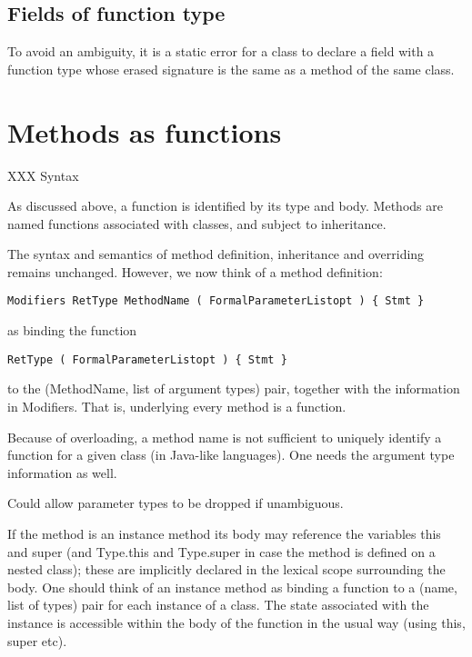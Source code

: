 \subsection{ Fields of function type}

To avoid an ambiguity, it is a static error for a class to declare a
field with a function type whose erased signature is the same as a
method of the same class.


\section{ Methods as functions}


      XXX Syntax


As discussed above, a function is identified by its type and body.
Methods are named functions associated with classes, and subject to
inheritance.

The syntax and semantics of method definition, inheritance and
overriding remains unchanged. However, we now think of a method definition:

\begin{verbatim}
Modifiers RetType MethodName ( FormalParameterListopt ) { Stmt }
\end{verbatim}

as binding the function

\begin{verbatim}
RetType ( FormalParameterListopt ) { Stmt }
\end{verbatim}

to the (MethodName, list of argument types) pair, together with the
information in Modifiers. That is, underlying every method is a function.

\begin{note}
Because of overloading, a method name is not sufficient to
uniquely identify a function for a given class (in Java-like languages).
One needs the argument type information as well.
\end{note}

\begin{note}
Could allow parameter types to be dropped if unambiguous.
\end{note}

If the method is an instance method its body may reference the variables
this and super (and Type.this and Type.super in case the method is
defined on a nested class); these are implicitly declared in the lexical
scope surrounding the body. One should think of an instance method as
binding a function to a (name, list of types) pair for each instance of
a class. The state associated with the instance is accessible within the
body of the function in the usual way (using this, super etc).

